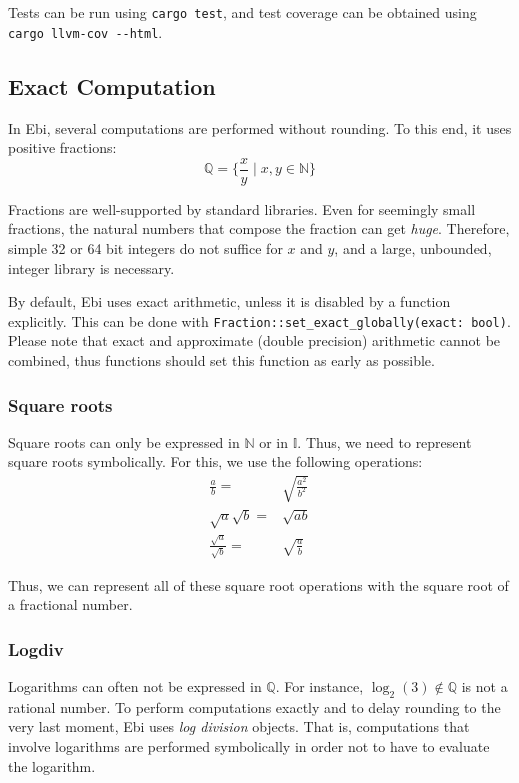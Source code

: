\documentclass{article}
\begin{document}
            Tests can be run using \verb=cargo test=, and test coverage can be obtained using \verb=cargo llvm-cov --html=.
		

    \subsection{Exact Computation}
    \label{sec:exact}
        In Ebi, several computations are performed without rounding.
        To this end, it uses positive fractions: 
        $$\mathbb{Q} = \{ \frac{x}{y} \mid x, y \in \mathbb{N} \}$$
    
        Fractions are well-supported by standard libraries.
        Even for seemingly small fractions, the natural numbers that compose the fraction can get \emph{huge}.
        Therefore, simple 32 or 64 bit integers do not suffice for $x$ and $y$, and a large, unbounded, integer library is necessary.
    
        By default, Ebi uses exact arithmetic, unless it is disabled by a function explicitly.
        This can be done with \verb=Fraction::set_exact_globally(exact: bool)=.
        Please note that exact and approximate (double precision) arithmetic cannot be combined, thus functions should set this function as early as possible.

        \subsubsection{Square roots}
            Square roots can only be expressed in $\mathbb{N}$ or in $\mathbb{I}$.
            Thus, we need to represent square roots symbolically.
            For this, we use the following operations:
            \begin{align*}
                \frac{a}{b} ={}& \sqrt{\frac{a^2}{b^2}}\\
                \sqrt{a} \sqrt{b} ={}& \sqrt{a b}\\
                \frac{\sqrt{a}}{\sqrt{b}} ={}& \sqrt{\frac{a}{b}}
            \end{align*}
    
            Thus, we can represent all of these square root operations with the square root of a fractional number.

        \subsubsection{Logdiv}
            Logarithms can often not be expressed in $\mathbb{Q}$.
            For instance, $\log_2(3) \notin \mathbb{Q}$ is not a rational number.
            To perform computations exactly and to delay rounding to the very last moment, Ebi uses \emph{log division} objects.
            That is, computations that involve logarithms are performed symbolically in order not to have to evaluate the logarithm.
            
\end{document}
